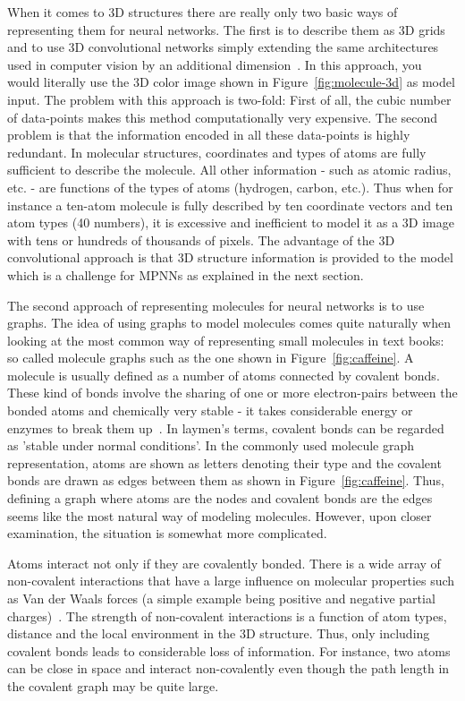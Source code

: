 When it comes to 3D structures there are really only two basic ways of representing them for neural networks. The first is to describe them as 3D grids and to use 3D convolutional networks simply extending the same architectures used in computer vision by an additional dimension~\cite{Wallach2015}. In this approach, you would literally use the 3D color image shown in Figure~\ref{fig:molecule-3d} as model input. The problem with this approach is two-fold: First of all, the cubic number of data-points makes this method computationally very expensive. The second problem is that the information encoded in all these data-points is highly redundant. In molecular structures, coordinates and types of atoms are fully sufficient to describe the molecule. All other information - such as atomic radius, etc. - are functions of the types of atoms (hydrogen, carbon, etc.). Thus when for instance a ten-atom molecule is fully described by ten coordinate vectors and ten atom types (40 numbers), it is excessive and inefficient to model it as a 3D image with tens or hundreds of thousands of pixels. The advantage of the 3D convolutional approach is that 3D structure information is provided to the model which is a challenge for MPNNs as explained in the next section.


The second approach of representing molecules for neural networks is to use graphs. The idea of using graphs to model molecules comes quite naturally when looking at the most common way of representing small molecules in text books: so called molecule graphs such as the one shown in Figure~\ref{fig:caffeine}. A molecule is usually defined as a number of atoms connected by covalent bonds. These kind of bonds involve the sharing of one or more electron-pairs between the bonded atoms and chemically very stable - it takes considerable energy or enzymes to break them up~\cite{Organic-chemistry}. In laymen's terms, covalent bonds can be regarded as 'stable under normal conditions'. In the commonly used molecule graph representation, atoms are shown as letters denoting their type and the covalent bonds are drawn as edges between them as shown in Figure~\ref{fig:caffeine}. Thus, defining a graph where atoms are the nodes and covalent bonds are the edges seems like the most natural way of modeling molecules. However, upon closer examination, the situation is somewhat more complicated.

Atoms interact not only if they are covalently bonded. There is a wide array of non-covalent interactions that have a large influence on molecular properties such as Van der Waals forces (a simple example being positive and negative partial charges)~\cite{Organic-chemistry}. The strength of non-covalent interactions is a function of atom types, distance and the local environment in the 3D structure. Thus, only including covalent bonds leads to considerable loss of information. For instance, two atoms can be close in space and interact non-covalently even though the path length in the covalent graph may be quite large.


